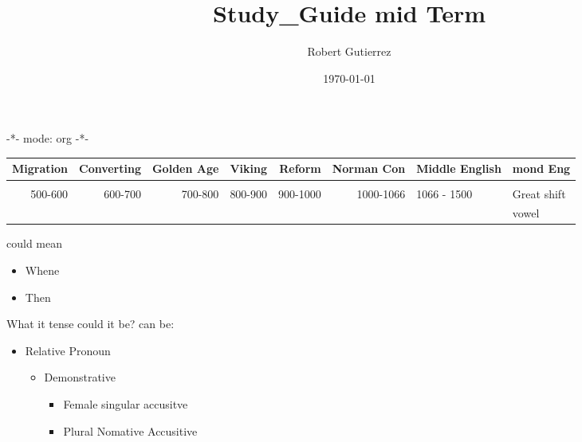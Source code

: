 \documentclass[11pt]{article}
\author{Robert Gutierrez}
\date{\today}
\title{Study\_Guide mid Term}
\begin{document}
\maketitle
\tableofcontents

-*- mode: org -*-





\begin{center}
\begin{tabular}{rrrrrrll}
Migration & Converting & Golden Age & Viking & Reform & Norman Con & Middle English & mond Eng\\
\hline
 &  &  &  &  &  &  & \\
500-600 & 600-700 & 700-800 & 800-900 & 900-1000 & 1000-1066 & 1066 - 1500 & Great shift\\
 &  &  &  &  &  &  & vowel\\
\hline
\end{tabular}
\end{center}




\TH could mean 
\begin{itemize}
\item Whene
\item Then
\end{itemize}

What it tense could it be? \TH can be: 
\begin{itemize}
\item Relative Pronoun
\begin{itemize}
\item Demonstrative
\begin{itemize}
\item Female singular accusitve
\item Plural Nomative Accusitive
\end{itemize}
\end{itemize}
\end{itemize}
\end{document}
